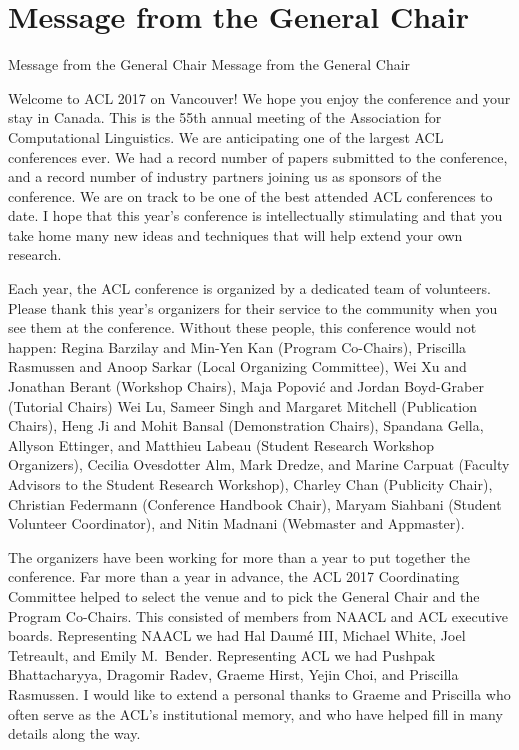 \vspace{2em}

\section{Message from the General Chair}\vspace{2em}
\setheaders%
    {Message from the General Chair}%
    {Message from the General Chair}
\thispagestyle{emptyheader}

\setlength{\parskip}{1ex}


Welcome to ACL 2017 on Vancouver!  We hope you enjoy the conference and your
stay in Canada.    This is the 55th annual meeting of the Association for Computational Linguistics.  We are anticipating one of the largest ACL conferences ever.  We had a record number of papers submitted to the conference, and a record number of industry partners joining us as sponsors of the conference.   We are on track to be one of the best attended ACL conferences to date.   I hope that this year's conference is intellectually stimulating and that you take home many new ideas and techniques that will help extend your own research.

Each year, the ACL conference is organized by a dedicated team of volunteers.  Please thank this year's organizers for their service to the community when you see them at the conference.  Without these people, this conference would not happen:  Regina Barzilay and Min-Yen Kan (Program Co-Chairs),
Priscilla Rasmussen and Anoop Sarkar (Local Organizing Committee),
Wei Xu and  Jonathan Berant (Workshop Chairs),
Maja Popovi\'c and Jordan Boyd-Graber (Tutorial Chairs)
Wei Lu, Sameer Singh and Margaret Mitchell (Publication Chairs),
Heng Ji and Mohit Bansal (Demonstration Chairs),
Spandana Gella, Allyson Ettinger, and Matthieu Labeau (Student Research Workshop Organizers),
Cecilia Ovesdotter Alm, Mark Dredze, and Marine Carpuat (Faculty Advisors to the Student Research Workshop),
Charley Chan  (Publicity Chair),
Christian Federmann (Conference Handbook Chair), 
Maryam Siahbani (Student Volunteer Coordinator), 
and 
Nitin Madnani (Webmaster and Appmaster).

The organizers have been working for more than a year to put together the conference.  Far more than a year in advance, the  ACL 2017 Coordinating Committee helped to select the venue and to pick the General Chair and the Program Co-Chairs.  This consisted of members from  NAACL and ACL executive boards. Representing NAACL we had Hal Daum\'e III,  Michael White, Joel Tetreault,  and Emily M.\ Bender.  Representing ACL we had  Pushpak Bhattacharyya, Dragomir Radev,   Graeme Hirst, Yejin Choi, and Priscilla Rasmussen.  I would like to extend a personal thanks to Graeme and Priscilla who often serve as the ACL’s institutional memory, and who have helped fill in many details along the way.

